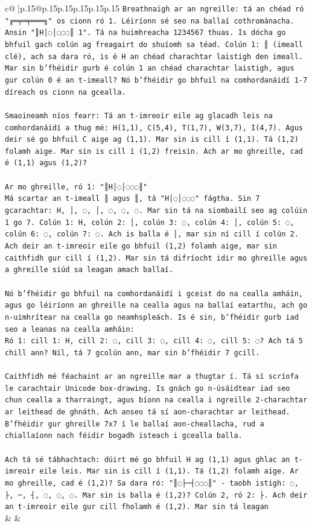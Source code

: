 \documentclass{article}
\begin{document}
{\begin{supertabular}{c@{$\;$}|p{.15\linewidth}@{}p{.15\linewidth}p{.15\linewidth}p{.15\linewidth}p{.15\linewidth}p{.15\linewidth}}
{{{\texttt{Breathnaigh ar an ngreille: tá an chéad ró "╔═╤═╤═══╗" os cionn ró 1. Léiríonn sé seo na ballaí cothrománacha. Ansin "║H│◌│◌◌◌║ 1". Tá na huimhreacha 1234567 thuas. Is dócha go bhfuil gach colún ag freagairt do shuíomh sa téad. Colún 1: ║ (imeall clé), ach sa dara ró, is é H an chéad charachtar laistigh den imeall. Mar sin b'fhéidir gurb é colún 1 an chéad charachtar laistigh, agus gur colún 0 é an t{-}imeall? Nó b'fhéidir go bhfuil na comhordanáidí 1{-}7 díreach os cionn na gcealla.} \\
\\ 
\texttt{Smaoineamh níos fearr: Tá an t{-}imreoir eile ag glacadh leis na comhordanáidí a thug mé: H(1,1), C(5,4), T(1,7), W(3,7), I(4,7). Agus deir sé go bhfuil C aige ag (1,1). Mar sin is cill í (1,1). Tá (1,2) folamh aige. Mar sin is cill í (1,2) freisin. Ach ar mo ghreille, cad é (1,1) agus (1,2)?} \\
\\ 
\texttt{Ar mo ghreille, ró 1: "║H│◌│◌◌◌║"} \\
\texttt{Má scartar an t{-}imeall ║ agus ║, tá "H│◌│◌◌◌" fágtha. Sin 7 gcarachtar: H, │, ◌, │, ◌, ◌, ◌. Mar sin tá na siombailí seo ag colúin 1 go 7. Colún 1: H, colún 2: │, colún 3: ◌, colún 4: │, colún 5: ◌, colún 6: ◌, colún 7: ◌. Ach is balla é │, mar sin ní cill í colún 2. Ach deir an t{-}imreoir eile go bhfuil (1,2) folamh aige, mar sin caithfidh gur cill í (1,2). Mar sin tá difríocht idir mo ghreille agus a ghreille siúd sa leagan amach ballaí.} \\
\\ 
\texttt{Nó b'fhéidir go bhfuil na comhordanáidí i gceist do na cealla amháin, agus go léiríonn an ghreille na cealla agus na ballaí eatarthu, ach go n{-}uimhrítear na cealla go neamhspleách. Is é sin, b'fhéidir gurb iad seo a leanas na cealla amháin:} \\
\texttt{Ró 1: cill 1: H, cill 2: ◌, cill 3: ◌, cill 4: ◌, cill 5: ◌? Ach tá 5 chill ann? Níl, tá 7 gcolún ann, mar sin b'fhéidir 7 gcill.} \\
\\ 
\texttt{Caithfidh mé féachaint ar an ngreille mar a thugtar í. Tá sí scríofa le carachtair Unicode box{-}drawing. Is gnách go n{-}úsáidtear iad seo chun cealla a tharraingt, agus bíonn na cealla i ngreille 2{-}charachtar ar leithead de ghnáth. Ach anseo tá sí aon{-}charachtar ar leithead. B'fhéidir gur ghreille 7x7 í le ballaí aon{-}cheallacha, rud a chiallaíonn nach féidir bogadh isteach i gcealla balla.} \\
\\ 
\texttt{Ach tá sé tábhachtach: dúirt mé go bhfuil H ag (1,1) agus ghlac an t{-}imreoir eile leis. Mar sin is cill í (1,1). Tá (1,2) folamh aige. Ar mo ghreille, cad é (1,2)? Sa dara ró: "║◌├─┤◌◌◌║" {-} taobh istigh: ◌, ├, ─, ┤, ◌, ◌, ◌. Mar sin is balla é (1,2)? Colún 2, ró 2: ├. Ach deir an t{-}imreoir eile gur cill fholamh é (1,2). Mar sin tá leagan} \\
            }
        }
    }
    & & \\ \\


\end{supertabular}}
\end{document}

